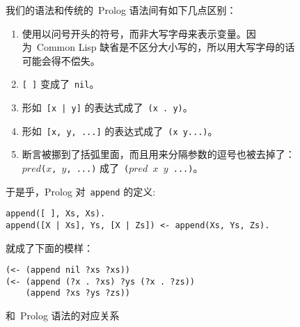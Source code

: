 \begin{figure}
我们的语法和传统的~Prolog 语法间有如下几点区别：
\begin{enumerate}
\item 使用以问号开头的符号，而非大写字母来表示变量。因为~Common Lisp 缺省是不区分大小写的，所以用大写字母的话可能会得不偿失。
\item \verb|[ ]| 变成了~\verb|nil|。
\item 形如~\verb+[x | y]+ 的表达式成了~\verb|(x . y)|。
\item 形如~\verb|[x, y, ...]| 的表达式成了~\verb|(x y...)|。
\item 断言被挪到了括弧里面，而且用来分隔参数的逗号也被去掉了：\texttt{$pred$($x$, $y$, ...)} 成了~\texttt{($pred$ $x$ $y$ ...)}。
\end{enumerate}

于是乎，Prolog 对~\verb|append| 的定义:
\begin{lstlisting}
append([ ], Xs, Xs).
append([X | Xs], Ys, [X | Zs]) <- append(Xs, Ys, Zs).
\end{lstlisting}
就成了下面的模样：
\begin{lstlisting}
(<- (append nil ?xs ?xs))
(<- (append (?x . ?xs) ?ys (?x . ?zs))
    (append ?xs ?ys ?zs))
\end{lstlisting}
  \caption{和~Prolog 语法的对应关系}
  \label{fig:prolog_syntax_equivalence}
\end{figure}

